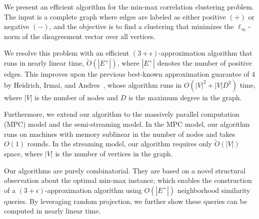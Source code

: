 We present an efficient algorithm for the min-max correlation clustering problem. The input is a complete graph where edges are labeled as either positive $(+)$ or negative $(-)$, and the objective is to find a clustering that minimizes the $\ell_{\infty}$-norm of the disagreement vector over all vertices.

We resolve this problem with an efficient $(3 + \epsilon)$-approximation algorithm that runs in nearly linear time, $\tilde{O}(|E^+|)$, where $|E^+|$ denotes the number of positive edges. This improves upon the previous best-known approximation guarantee of 4 by Heidrich, Irmai, and
Andres~\cite{heidrich20244}, whose algorithm runs in $O(|V|^2 + |V| D^2)$ time, where $|V|$ is the number of nodes and $D$ is the maximum degree in the graph.

Furthermore, we extend our algorithm to the massively parallel computation (MPC) model and the semi-streaming model. In the MPC model, our algorithm runs on machines with memory sublinear in the number of nodes and takes $O(1)$ rounds. In the streaming model, our algorithm requires only $\tilde{O}(|V|)$ space, where $|V|$ is the number of vertices in the graph.

Our algorithms are purely combinatorial. They are based on a novel structural observation about the optimal min-max instance, which enables the construction of a $(3 + \epsilon)$-approximation algorithm using $O(|E^+|)$ neighborhood similarity queries. By leveraging random projection, we further show these queries can be computed in nearly linear time.

